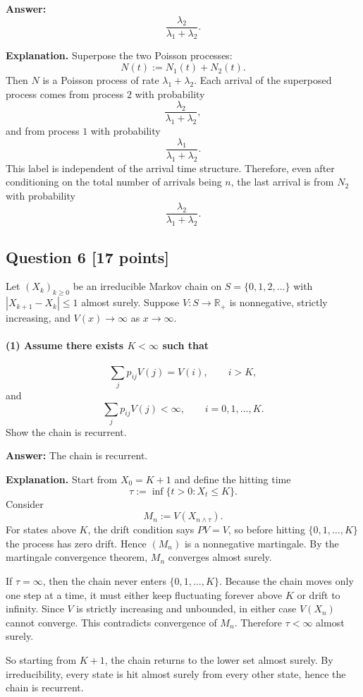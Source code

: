 \documentclass[11pt]{article}
\theoremstyle{definition}
\begin{document}
\textbf{Answer:}
\[
\frac{\lambda_2}{\lambda_1+\lambda_2}.
\]

\textbf{Explanation.} Superpose the two Poisson processes:
\[
N(t):=N_1(t)+N_2(t).
\]
Then $N$ is a Poisson process of rate $\lambda_1+\lambda_2$. Each arrival of the superposed process comes from process $2$ with probability
\[
\frac{\lambda_2}{\lambda_1+\lambda_2},
\]
and from process $1$ with probability
\[
\frac{\lambda_1}{\lambda_1+\lambda_2}.
\]
This label is independent of the arrival time structure. Therefore, even after conditioning on the total number of arrivals being $n$, the last arrival is from $N_2$ with probability
\[
\frac{\lambda_2}{\lambda_1+\lambda_2}.
\]

\subsection*{Question 6 \hfill [17 points]}
Let $(X_k)_{k\ge 0}$ be an irreducible Markov chain on $S=\{0,1,2,\dots\}$ with $|X_{k+1}-X_k|\le 1$ almost surely. Suppose $V:S\to\mathbb R_+$ is nonnegative, strictly increasing, and $V(x)\to\infty$ as $x\to\infty$.

\paragraph{(1) Assume there exists $K<\infty$ such that}
\[
\sum_j p_{ij}V(j)=V(i), \qquad i>K,
\]
and
\[
\sum_j p_{ij}V(j)<\infty, \qquad i=0,1,\dots,K.
\]
Show the chain is recurrent.

\textbf{Answer:} The chain is recurrent.

\textbf{Explanation.} Start from $X_0=K+1$ and define the hitting time
\[
\tau:=\inf\{t>0: X_t\le K\}.
\]
Consider
\[
M_n:=V(X_{n\wedge\tau}).
\]
For states above $K$, the drift condition says $PV=V$, so before hitting $\{0,1,\dots,K\}$ the process has zero drift. Hence $(M_n)$ is a nonnegative martingale. By the martingale convergence theorem, $M_n$ converges almost surely.

If $\tau=\infty$, then the chain never enters $\{0,1,\dots,K\}$. Because the chain moves only one step at a time, it must either keep fluctuating forever above $K$ or drift to infinity. Since $V$ is strictly increasing and unbounded, in either case $V(X_n)$ cannot converge. This contradicts convergence of $M_n$. Therefore $\tau<\infty$ almost surely.

So starting from $K+1$, the chain returns to the lower set almost surely. By irreducibility, every state is hit almost surely from every other state, hence the chain is recurrent.
\end{document}
